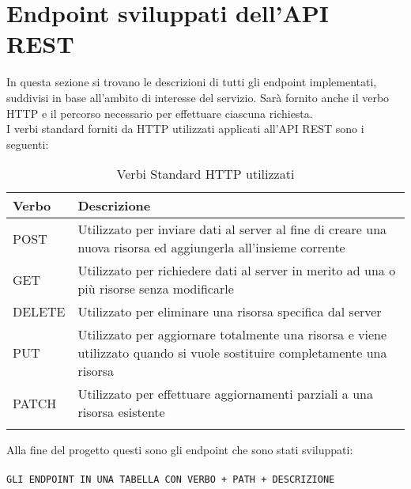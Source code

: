 \section{Endpoint sviluppati dell'API REST}
In questa sezione si trovano le descrizioni di tutti gli endpoint implementati, suddivisi in base all'ambito di interesse del servizio. Sarà fornito anche il verbo HTTP e il percorso necessario per effettuare ciascuna richiesta.\\
I verbi standard forniti da HTTP utilizzati applicati all'API REST sono i seguenti:
 
\setlength{\arrayrulewidth}{0.3mm}
\renewcommand{\arraystretch}{2.5}
\begin{center}
\begin{longtable}{p{2cm}|p{8cm}}
\textbf{Verbo}  & \textbf{Descrizione} \\ \midrule
\rowcolor{mygray} 
POST   & Utilizzato per inviare dati al server al fine di creare una nuova risorsa ed aggiungerla all'insieme corrente\\
GET    & Utilizzato per richiedere dati al server in merito ad una o più risorse senza modificarle          \\
\rowcolor{mygray}
DELETE &   Utilizzato per eliminare una risorsa specifica dal server          \\
PUT    &   Utilizzato per aggiornare totalmente una risorsa e viene utilizzato quando si vuole sostituire completamente una risorsa          \\
\rowcolor{mygray}
PATCH  &     Utilizzato per effettuare aggiornamenti parziali a una risorsa esistente        \\ \bottomrule
\caption{Verbi Standard HTTP utilizzati}
\label{tab:verbi-http}
\end{longtable}
\end{center}


\noindent Alla fine del progetto questi sono gli endpoint che sono stati sviluppati:\\\\
\texttt{GLI ENDPOINT IN UNA TABELLA CON VERBO + PATH + DESCRIZIONE}\\